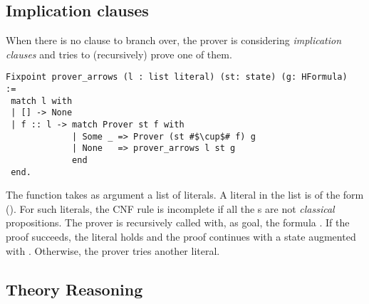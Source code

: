 \documentclass[utf8,a4paper,UKenglish,cleveref, autoref, thm-restate]{lipics-v2019}
\begin{document}
\subsection{Implication clauses}
When there is no clause to branch over, the prover is considering 
\emph{implication clauses} and tries to (recursively) prove one of
them.
\begin{verbatim}
Fixpoint prover_arrows (l : list literal) (st: state) (g: HFormula)  :=
 match l with
 | [] -> None
 | f :: l -> match Prover st f with
             | Some _ => Prover (st #$\cup$# f) g
             | None   => prover_arrows l st g
             end
 end.
\end{verbatim}
The function  takes as argument a list  of
literals.  A literal  in the list is of the form 
().
%
For such literals, the CNF rule  is incomplete if all the s are not \emph{classical} propositions.
%
The prover is recursively called with, as goal,
the formula . If the proof succeeds, the literal  holds
and the proof continues with a state augmented with .
Otherwise, the prover tries another literal.
%

\subsection{Theory Reasoning}
\label{sec:thy-reasoning}
\end{document}
